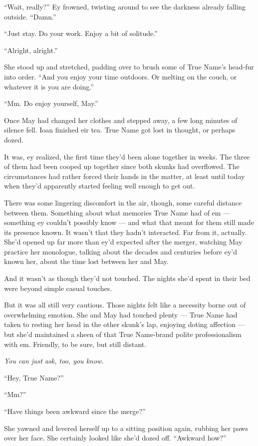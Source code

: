 ``Wait, really?'' Ey frowned, twisting around to see the darkness already falling outside. ``Damn.''

``Just stay. Do your work. Enjoy a bit of solitude.''

``Alright, alright.''

She stood up and stretched, padding over to brush some of True Name's head-fur into order. ``And you enjoy your time outdoors. Or melting on the couch, or whatever it is you are doing.''

``Mm. Do enjoy yourself, May.''

Once May had changed her clothes and stepped away, a few long minutes of silence fell. Ioan finished eir tea. True Name got lost in thought, or perhaps dozed.

It was, ey realized, the first time they'd been alone together in weeks. The three of them had been cooped up together since both skunks had overflowed. The circumstances had rather forced their hands in the matter, at least until today when they'd apparently started feeling well enough to get out.

There was some lingering discomfort in the air, though, some careful distance between them. Something about what memories True Name had of em — something ey couldn't possibly know — and what that meant for them still made its presence known. It wasn't that they hadn't interacted. Far from it, actually. She'd opened up far more than ey'd expected after the merger, watching May practice her monologue, talking about the decades and centuries before ey'd known her, about the time lost between her and May.

And it wasn't as though they'd not touched. The nights she'd spent in their bed were beyond simple casual touches.

But it was all still very cautious. Those nights felt like a necessity borne out of overwhelming emotion. She and May had touched plenty — True Name had taken to resting her head in the other skunk's lap, enjoying doting affection — but she'd maintained a sheen of that True Name-brand polite professionalism with em. Friendly, to be sure, but still distant.

\emph{You can just ask, too, you know.}

``Hey, True Name?''

``Mm?''

``Have things been awkward since the merge?''

She yawned and levered herself up to a sitting position again, rubbing her paws over her face. She certainly looked like she'd dozed off. ``Awkward how?''

